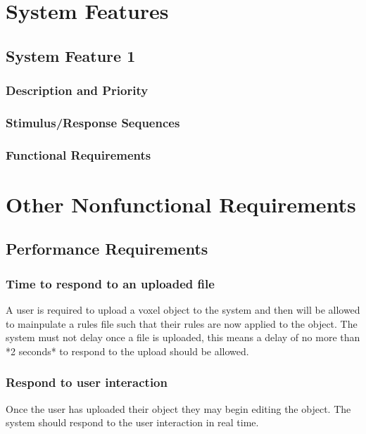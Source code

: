 \documentclass[english]{article}
\begin{document}
	\section{System Features}
	
		\subsection{System Feature 1}
		
			 \subsubsection{Description and Priority}
			 
			 \subsubsection{Stimulus/Response Sequences}
			 
			 \subsubsection{Functional Requirements}
			 
	\pagebreak
	
	\section{Other Nonfunctional Requirements}
	
		\subsection{Performance Requirements}
		\subsubsection {Time to respond to an uploaded file}
		A user is required to upload a voxel object to the system and then will be allowed to mainpulate a rules file such that 
		their rules are now applied to the object. The system must not delay once a file is uploaded, this means a delay of no 
		more than *2 seconds* to respond to the upload should be allowed.
		
		\subsubsection{Respond to user interaction}
		Once the user has uploaded their object they may begin editing the object. The system should respond to the user 
		interaction in real time.
		
\end{document}
